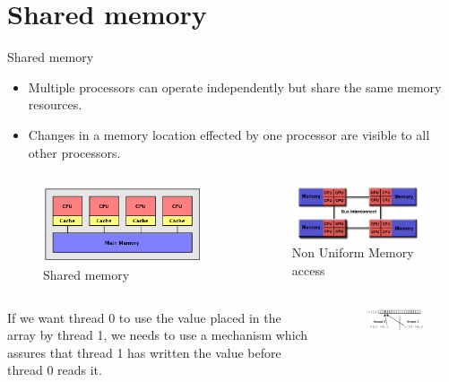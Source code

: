 \documentclass[10pt,times]{beamer}
\begin{document}
\section{Shared memory}
\begin{frame}{Shared memory}
\begin{itemize}
\item Multiple processors can operate independently but share the same memory 
resources.

\item Changes in a memory location effected by one processor are visible to all 
other processors. 
\end{itemize}

\begin{columns}
\begin{figure}
\includegraphics[width=0.7\linewidth]{figs/shared_memory.png}
\caption*{Shared memory}
\end{figure}
\begin{figure}
\includegraphics[width=0.7\linewidth]{figs/numa.png}
\caption*{Non Uniform Memory access}
\end{figure}
\end{columns}
\begin{columns}
If we want thread 0 to use the value placed in the array by thread 1, we needs to 
use a mechanism which assures that thread 1 has written the value before thread 0 
reads it.
\begin{figure}
\includegraphics[width=\linewidth]{figs/shared_memory_vector.png}
\end{figure}
\end{columns}
\end{frame}
\end{document}
